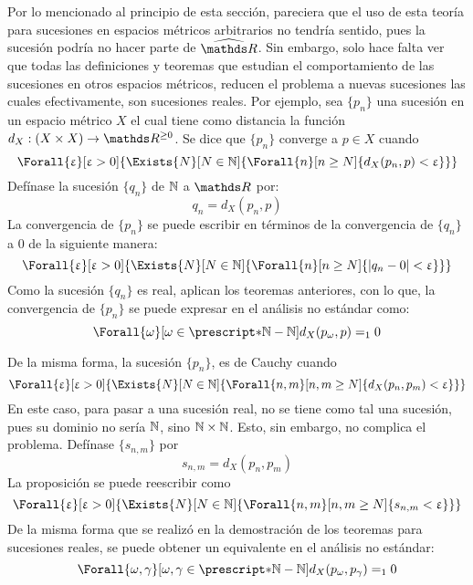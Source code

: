 Por lo mencionado al principio de esta sección, pareciera que el uso de
esta teoría para sucesiones en espacios métricos arbitrarios no tendría
sentido, pues la sucesión podría no hacer parte de $\Rh$. Sin embargo,
solo hace falta ver que todas las definiciones y teoremas que estudian
el comportamiento de las sucesiones en otros espacios métricos, reducen
el problema a nuevas sucesiones las cuales efectivamente, son sucesiones
reales. Por ejemplo, sea $\{p_n\}$ una sucesión en un espacio métrico $X$
el cual tiene como distancia la función $d_X: (X\times X) \to \R^{\geq 0}$.
Se dice que $\{p_n\}$ converge a $p\in X$ cuando
\[\Forall{\e}[\e>0]{\Exists{N}[N\in\N]{\Forall{n}[n\geq N]{d_X(p_n, p)<\e}}}\]
Defínase la sucesión $\{q_n\}$ de $\mathbb{N}$ a $\R$ por:
\[q_n = d_X(p_n,p)\]
La convergencia de $\{p_n\}$ se puede escribir en términos de la
convergencia de $\{q_n\}$ a $0$ de la siguiente manera:
\[\Forall{\e}[\e>0]{\Exists{N}[N\in\N]{\Forall{n}[n\geq N]{|q_n - 0| <\e}}}\]
Como la sucesión $\{q_n\}$ es real, aplican los teoremas anteriores,
con lo que, la convergencia de $\{p_n\}$ se puede expresar en el análisis
no estándar como:
\[\Forall{\omega}[\omega\in\st{\N}-\N]{d_X(p_\omega,p)=_1 0}\]

De la misma forma, la sucesión $\{p_n\}$, es de Cauchy cuando
\[\Forall{\e}[\e>0]{\Exists{N}[N\in\N]{\Forall{n,m}[n,m\geq N]{d_X(p_n,p_m)<\e}}}\]
En este caso, para pasar a una sucesión real, no se tiene como tal una
sucesión, pues su dominio no sería $\mathbb{N}$, sino $\mathbb{N}\times\mathbb{N}$. Esto, sin
embargo, no complica el problema. Defínase $\{s_{n,m}\}$ por
\[s_{n,m} = d_X(p_n,p_m)\]
La proposición se puede reescribir como
\[\Forall{\e}[\e>0]{\Exists{N}[N\in\N]{\Forall{n,m}[n,m\geq N]{s_{n,m}<\e}}}\]
De la misma forma que se realizó en la demostración de los teoremas
para sucesiones reales, se puede obtener un equivalente en el
análisis no estándar:
\[\Forall{\omega,\gamma}[\omega,\gamma\in\st{\N}-\N]{d_X(p_\omega,p_\gamma)=_1 0}\]
